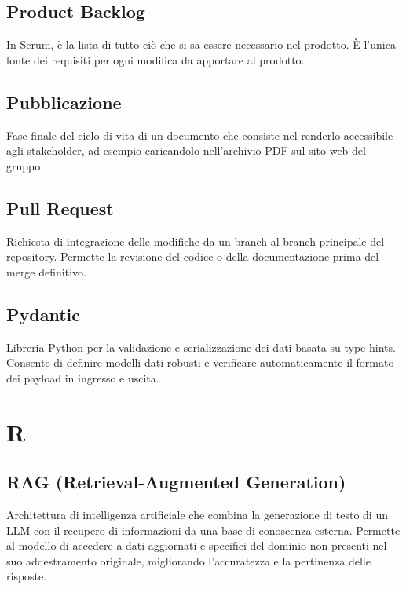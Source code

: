 \documentclass[a4paper, 11pt, oneside]{scrartcl} %
\begin{document}
\subsection*{Product Backlog}
In Scrum, è la lista di tutto ciò che si sa essere necessario nel prodotto. È l'unica fonte dei requisiti per ogni modifica da apportare al prodotto.
\vspace{0.5cm}

\subsection*{Pubblicazione}


Fase finale del ciclo di vita di un documento che consiste nel renderlo accessibile agli stakeholder, ad esempio caricandolo nell'archivio PDF sul sito web del gruppo.

\vspace{0.5cm}

\subsection*{Pull Request}


Richiesta di integrazione delle modifiche da un branch al branch principale del repository. Permette la revisione del codice o della documentazione prima del merge definitivo.

\vspace{0.5cm}

\subsection*{Pydantic}
Libreria Python per la validazione e serializzazione dei dati basata su type hints. Consente di definire modelli dati robusti e verificare automaticamente il formato dei payload in ingresso e uscita.
\vspace{0.5cm}


\section*{R}


\subsection*{RAG (Retrieval-Augmented Generation)}
Architettura di intelligenza artificiale che combina la generazione di testo di un LLM con il recupero di informazioni da una base di conoscenza esterna. Permette al modello di accedere a dati aggiornati e specifici del dominio non presenti nel suo addestramento originale, migliorando l'accuratezza e la pertinenza delle risposte.
\vspace{0.5cm}
\end{document}
